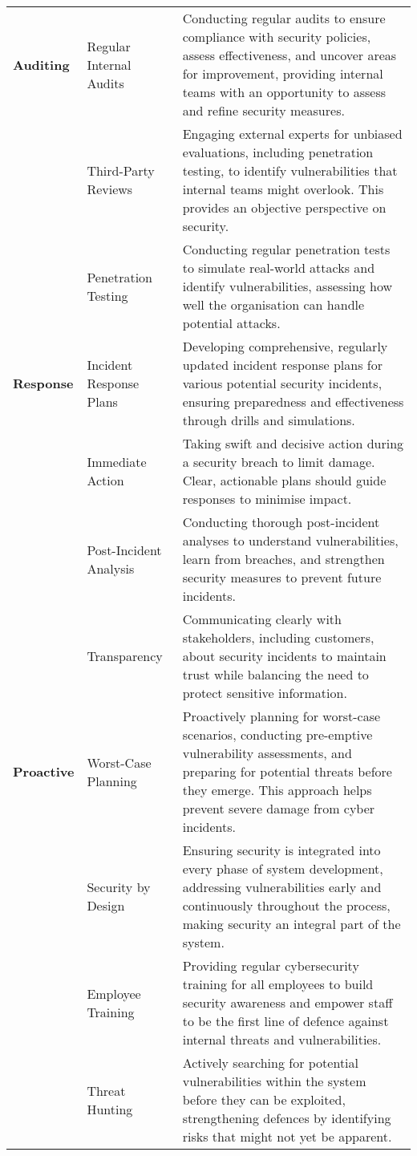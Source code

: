 \begin{longtable}{|>{\raggedright}m{2.5cm}|>{\raggedright}m{3.5cm}|>{\raggedright\arraybackslash}m{8cm}|}
    \textbf{Auditing} & Regular Internal Audits & Conducting regular audits to ensure compliance with security policies, assess effectiveness, and uncover areas for improvement, providing internal teams with an opportunity to assess and refine security measures. \\
    \cline{2-3}
    & Third-Party Reviews & Engaging external experts for unbiased evaluations, including penetration testing, to identify vulnerabilities that internal teams might overlook. This provides an objective perspective on security. \\
    \cline{2-3}
    & Penetration Testing & Conducting regular penetration tests to simulate real-world attacks and identify vulnerabilities, assessing how well the organisation can handle potential attacks. \\
    \hline\hline

    \textbf{Response} & Incident Response Plans & Developing comprehensive, regularly updated incident response plans for various potential security incidents, ensuring preparedness and effectiveness through drills and simulations. \\
    \cline{2-3}
    & Immediate Action & Taking swift and decisive action during a security breach to limit damage. Clear, actionable plans should guide responses to minimise impact. \\
    \cline{2-3}
    & Post-Incident Analysis & Conducting thorough post-incident analyses to understand vulnerabilities, learn from breaches, and strengthen security measures to prevent future incidents. \\
    \cline{2-3}
    & Transparency & Communicating clearly with stakeholders, including customers, about security incidents to maintain trust while balancing the need to protect sensitive information. \\
    \hline\hline

    \textbf{Proactive} & Worst-Case Planning & Proactively planning for worst-case scenarios, conducting pre-emptive vulnerability assessments, and preparing for potential threats before they emerge. This approach helps prevent severe damage from cyber incidents. \\
    \cline{2-3}
    & Security by Design & Ensuring security is integrated into every phase of system development, addressing vulnerabilities early and continuously throughout the process, making security an integral part of the system. \\
    \cline{2-3}
    & Employee Training & Providing regular cybersecurity training for all employees to build security awareness and empower staff to be the first line of defence against internal threats and vulnerabilities. \\
    \cline{2-3}
    & Threat Hunting & Actively searching for potential vulnerabilities within the system before they can be exploited, strengthening defences by identifying risks that might not yet be apparent. \\
\end{longtable}